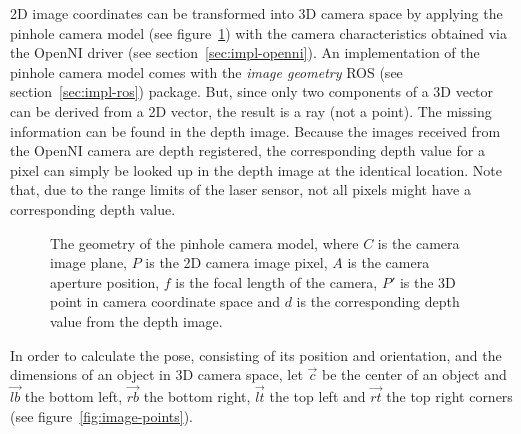 2D image coordinates can be transformed into 3D camera space by applying the pinhole camera model (see figure~\ref{fig:pinhole-camera}) with the camera characteristics obtained via the OpenNI driver (see section~\ref{sec:impl-openni}). An implementation of the pinhole camera model comes with the \textit{image geometry} ROS (see section~\ref{sec:impl-ros}) package. But, since only two components of a 3D vector can be derived from a 2D vector, the result is a ray (not a point). The missing information can be found in the depth image. Because the images received from the OpenNI camera are depth registered, the corresponding depth value for a pixel can simply be looked up in the depth image at the identical location. Note that, due to the range limits of the laser sensor, not all pixels might have a corresponding depth value.

\begin{figure}[H]
  \centering
  \caption[The geometry of the pinhole camera model]{The geometry of the pinhole camera model, where $C$ is the camera image plane, $P$ is the 2D camera image pixel, $A$ is the camera aperture position, $f$ is the focal length of the camera, $P'$ is the 3D point in camera coordinate space and $d$ is the corresponding depth value from the depth image.}
  \label{fig:pinhole-camera}
\end{figure}

In order to calculate the pose, consisting of its position and orientation, and the dimensions of an object in 3D camera space, let $\overrightarrow{c}$ be the center of an object and $\overrightarrow{lb}$ the bottom left, $\overrightarrow{rb}$ the bottom right, $\overrightarrow{lt}$ the top left and $\overrightarrow{rt}$ the top right corners (see figure~\ref{fig:image-points}).

